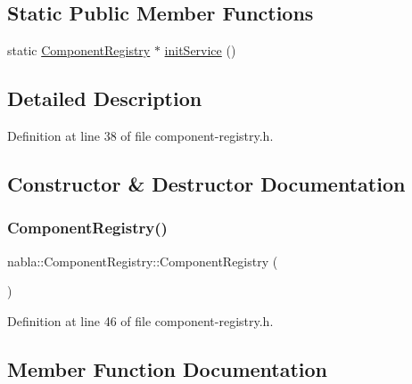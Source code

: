 \subsection*{Static Public Member Functions}
\begin{DoxyCompactItemize}
\item 
static \mbox{\hyperlink{classnabla_1_1_component_registry}{Component\+Registry}} $\ast$ \mbox{\hyperlink{classnabla_1_1_component_registry_ad3bcf27ad62f7628ac2e69affab26a9e}{init\+Service}} ()
\end{DoxyCompactItemize}


\subsection{Detailed Description}


Definition at line 38 of file component-\/registry.\+h.



\subsection{Constructor \& Destructor Documentation}
\mbox{\label{classnabla_1_1_component_registry_a41e06a6e157b4458ad1353070f916e4a}} 
\subsubsection{\texorpdfstring{ComponentRegistry()}{ComponentRegistry()}}
{\footnotesize\ttfamily nabla\+::\+Component\+Registry\+::\+Component\+Registry (\begin{DoxyParamCaption}{ }\end{DoxyParamCaption})\hspace{0.3cm}{\ttfamily [inline]}}



Definition at line 46 of file component-\/registry.\+h.



\subsection{Member Function Documentation}
\mbox{\label{classnabla_1_1_component_registry_ac6ea0dbc1f8d059e5344a23507a5ad6f}} 
